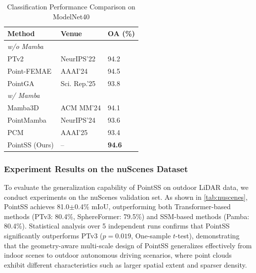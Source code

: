 \documentclass[a4paper,fleqn]{cas-sc}
\begin{document}
\begin{table}
	\centering
	\caption{Classification Performance Comparison on ModelNet40}
	\label{tab:ModelNet}
	\begin{tabular}{@{}lll@{}}
		\toprule
		\textbf{Method} & \textbf{Venue} & \textbf{OA (\%)} \\ \midrule
		\multicolumn{3}{l}{\textit{w/o Mamba}} \\
		PTv2 \cite{ptv2} & NeurIPS'22 & 94.2 \\
		Point-FEMAE \cite{FEMAE} & AAAI'24 & 94.5 \\
		PointGA \cite{pointga} & Sci. Rep.'25 & 93.8 \\ \midrule
		\multicolumn{3}{l}{\textit{w/ Mamba}} \\
		Mamba3D \cite{Mamba3D} & ACM MM'24 & 94.1 \\
		PointMamba \cite{PointMamba} & NeurIPS'24 & 93.6 \\
		PCM \cite{pcm} & AAAI'25 & 93.4 \\
		PointSS (Ours) & -- & \textbf{94.6} \\ \bottomrule
	\end{tabular}
\end{table}

\subsubsection{Experiment Results on the nuScenes Dataset}

To evaluate the generalization capability of PointSS on outdoor LiDAR data, we conduct experiments on the nuScenes validation set. As shown in \cref{tab:nuscenes}, PointSS achieves 81.0$\pm$0.4\% mIoU, outperforming both Transformer-based methods (PTv3: 80.4\%, SphereFormer: 79.5\%) and SSM-based methods (Pamba: 80.4\%). Statistical analysis over 5 independent runs confirms that PointSS significantly outperforms PTv3 ($p=0.019$, One-sample $t$-test), demonstrating that the geometry-aware multi-scale design of PointSS generalizes effectively from indoor scenes to outdoor autonomous driving scenarios, where point clouds exhibit different characteristics such as larger spatial extent and sparser density.
\end{document}
